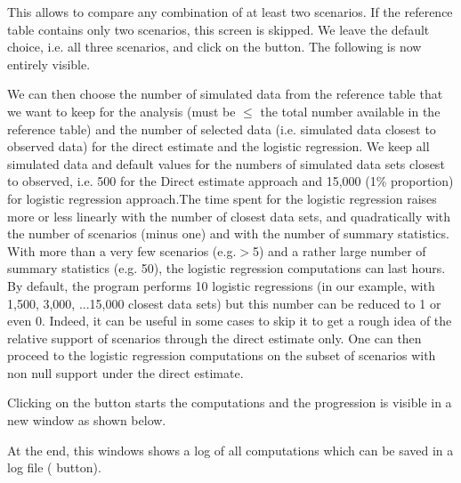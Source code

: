 This allows to compare any combination of at least two scenarios. If the reference table contains only two scenarios, this screen is skipped. We leave the default choice, i.e. all three scenarios, and click on the  button. The following is now entirely visible.


We can then choose the number of simulated data from the reference table that we want to keep for the analysis (must be $\leq$ the total number available in the reference table) and the number of selected data (i.e. simulated data closest to observed data) for the direct estimate and the logistic regression. We keep all simulated data and default values for the numbers of simulated data sets closest to observed, i.e. 500 for the Direct estimate approach and 15,000 (1\%  proportion) for logistic regression approach.The time spent for the logistic regression raises more or less linearly with the number of closest data sets, and quadratically with the number of scenarios (minus one) and with the number of summary statistics. With more than a very few scenarios (e.g.$>$5) and a rather large number of summary statistics (e.g. 50), the logistic regression computations can last hours. By default, the program performs 10 logistic regressions (in our example, with 1,500, 3,000, ...15,000 closest data sets) but this number can be reduced to 1 or even 0. Indeed, it can be useful in some cases to skip it to get a rough idea of the relative support of scenarios through the direct estimate only. One can then proceed to the logistic regression computations on the subset of scenarios with non null support under the direct estimate.

\newpage

Clicking on the  button starts the computations and the progression is visible in a new window as shown below.


At the end, this windows shows a log of all computations which can be saved in a log file (  button).

